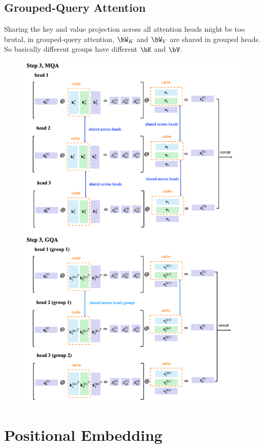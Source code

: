 \documentclass{article}
\begin{document}
\subsection{Grouped-Query Attention}
Sharing the key and value projection across all attention heads might be too brutal, in grouped-query attention, $\bW_K$ and $\bW_V$ are shared in grouped heads.
So basically different groups have different $\bK$ and $\bV$.

\begin{figure}[!h]
	\centering
	\includegraphics[scale=0.45]{imgs/GQA.png}
\end{figure}

\clearpage
\section{Positional Embedding}

\clearpage
 

\newpage
\appendix
\end{document}
